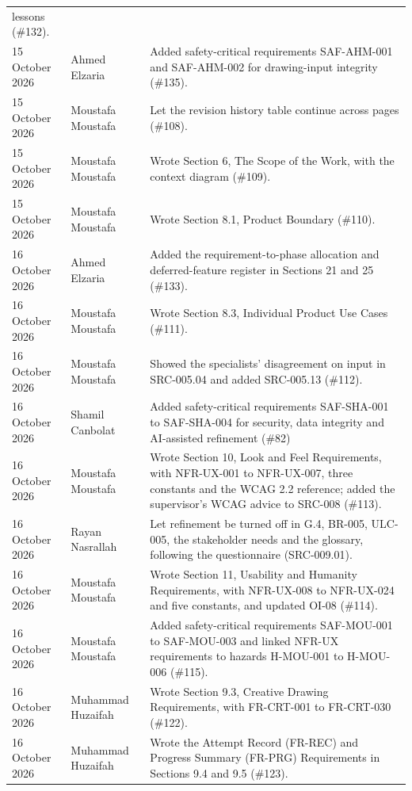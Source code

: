 \documentclass[12pt]{article}
\renewcommand{\_}{\textunderscore\allowbreak}%
\begin{document}
\begin{longtable}{@{}p{3cm}p{3cm}>{\raggedright\arraybackslash}p{\dimexpr\textwidth-6cm-4\tabcolsep\relax}@{}}
lessons (\#132).\\
15 October 2026 & Ahmed Elzaria & Added safety-critical requirements SAF-AHM-001
and SAF-AHM-002 for drawing-input integrity (\#135).\\
15 October 2026 & Moustafa Moustafa & Let the revision history table continue
across pages (\#108).\\
15 October 2026 & Moustafa Moustafa & Wrote Section 6, The Scope of the Work,
with the context diagram (\#109).\\
15 October 2026 & Moustafa Moustafa & Wrote Section 8.1, Product Boundary
(\#110).\\
16 October 2026 & Ahmed Elzaria & Added the requirement-to-phase allocation and
deferred-feature register in Sections 21 and 25 (\#133).\\
16 October 2026 & Moustafa Moustafa & Wrote Section 8.3, Individual Product Use
Cases (\#111).\\
16 October 2026 & Moustafa Moustafa & Showed the specialists' disagreement on
input in SRC-005.04 and added SRC-005.13 (\#112).\\
16 October 2026 & Shamil Canbolat & Added safety-critical requirements
SAF-SHA-001 to SAF-SHA-004 for security, data integrity and AI-assisted
refinement (\#82)\\
16 October 2026 & Moustafa Moustafa & Wrote Section 10, Look and Feel
Requirements, with NFR-UX-001 to NFR-UX-007, three constants and the WCAG 2.2
reference; added the supervisor's WCAG advice to SRC-008 (\#113).\\
16 October 2026 & Rayan Nasrallah & Let refinement be turned off in G.4, BR-005,
ULC-005, the stakeholder needs and the glossary, following the questionnaire
(SRC-009.01).\\
16 October 2026 & Moustafa Moustafa & Wrote Section 11, Usability and Humanity
Requirements, with NFR-UX-008 to NFR-UX-024 and five constants, and updated
OI-08 (\#114).\\
16 October 2026 & Moustafa Moustafa & Added safety-critical requirements
SAF-MOU-001 to SAF-MOU-003 and linked NFR-UX requirements to hazards H-MOU-001
to H-MOU-006 (\#115).\\
16 October 2026 & Muhammad Huzaifah & Wrote Section 9.3, Creative Drawing
Requirements, with FR-CRT-001 to FR-CRT-030 (\#122).\\
16 October 2026 & Muhammad Huzaifah & Wrote the Attempt Record (FR-REC) and
Progress Summary (FR-PRG) Requirements in Sections 9.4 and 9.5 (\#123).\\

\end{longtable}
\end{document}
